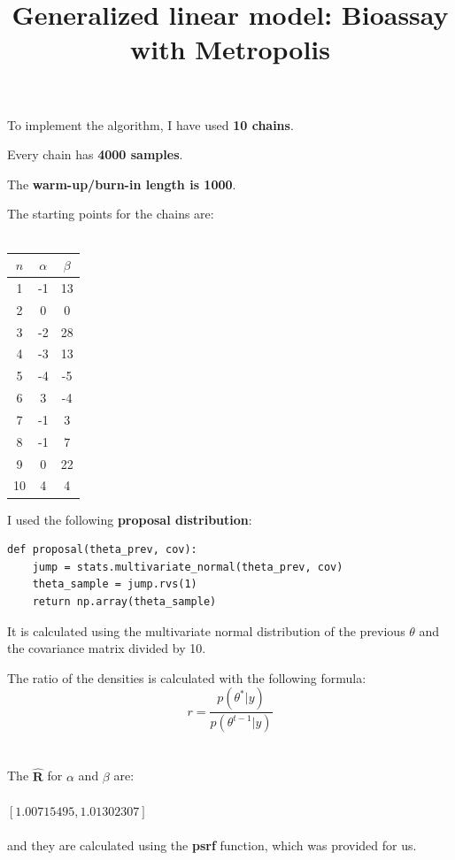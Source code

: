 \documentclass[11pt]{article}
\begin{document}
\title{\textbf{Generalized linear model: Bioassay with Metropolis}}
\maketitle


To implement the algorithm, I have used \textbf{10 chains}.

Every chain has \textbf{4000 samples}.

The \textbf{warm-up/burn-in length is 1000}.

The starting points for the chains are:
\\~\\
\begin{center}

\begin{tabular}{c|c|c}
$ n $ & $ \alpha $ & $ \beta $ \\ \hline
1 & -1 & 13 \\
2 & 0 & 0 \\ 
3 & -2 & 28 \\
4 & -3 & 13 \\
5 & -4 & -5 \\
6 & 3 & -4 \\ 
7 & -1 & 3 \\ 
8 & -1 & 7 \\
9 & 0 & 22 \\
10 & 4 & 4
\end{tabular}

\end{center}


I used the following \textbf{proposal distribution}:

\begin{lstlisting}
def proposal(theta_prev, cov):
    jump = stats.multivariate_normal(theta_prev, cov)
    theta_sample = jump.rvs(1)
    return np.array(theta_sample)
\end{lstlisting}

It is calculated using the multivariate normal distribution of the previous $ \theta $ and the covariance matrix \mbox{divided} by 10.

The ratio of the densities is calculated with the following formula:
$$ r = \frac{p(\theta^* | y)}{p(\theta^{t-1} | y)} $$
\\~\\

The $ \mathbf{\hat{R}} $ for $ \alpha $ and $ \beta $ are:
\\~\\
$ \mathbf{ \left[ 1.00715495, 1.01302307 \right] } $
\\~\\
and they are calculated using the \textbf{psrf} function, which was provided for us.
\end{document}
